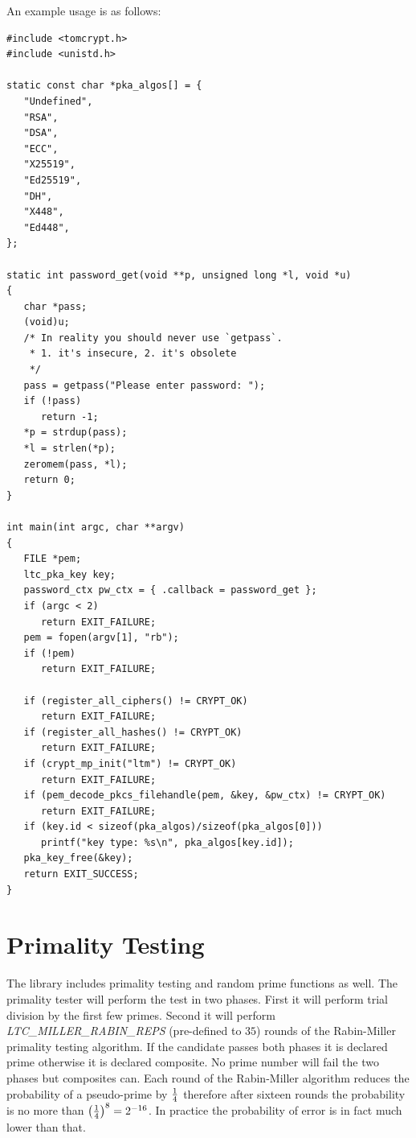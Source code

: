 \documentclass[synpaper]{book}
\newcommand{\mysection}[1]    %
	{                   %
	\section{#1}
   \markboth{\textsf{www.libtom.net}}{\thesection ~ {#1}}
	}
\begin{document}
An example usage is as follows:

\begin{small}
\begin{verbatim}
#include <tomcrypt.h>
#include <unistd.h>

static const char *pka_algos[] = {
   "Undefined",
   "RSA",
   "DSA",
   "ECC",
   "X25519",
   "Ed25519",
   "DH",
   "X448",
   "Ed448",
};

static int password_get(void **p, unsigned long *l, void *u)
{
   char *pass;
   (void)u;
   /* In reality you should never use `getpass`.
    * 1. it's insecure, 2. it's obsolete
    */
   pass = getpass("Please enter password: ");
   if (!pass)
      return -1;
   *p = strdup(pass);
   *l = strlen(*p);
   zeromem(pass, *l);
   return 0;
}

int main(int argc, char **argv)
{
   FILE *pem;
   ltc_pka_key key;
   password_ctx pw_ctx = { .callback = password_get };
   if (argc < 2)
      return EXIT_FAILURE;
   pem = fopen(argv[1], "rb");
   if (!pem)
      return EXIT_FAILURE;

   if (register_all_ciphers() != CRYPT_OK)
      return EXIT_FAILURE;
   if (register_all_hashes() != CRYPT_OK)
      return EXIT_FAILURE;
   if (crypt_mp_init("ltm") != CRYPT_OK)
      return EXIT_FAILURE;
   if (pem_decode_pkcs_filehandle(pem, &key, &pw_ctx) != CRYPT_OK)
      return EXIT_FAILURE;
   if (key.id < sizeof(pka_algos)/sizeof(pka_algos[0]))
      printf("key type: %s\n", pka_algos[key.id]);
   pka_key_free(&key);
   return EXIT_SUCCESS;
}

\end{verbatim}
\end{small}

\mysection{Primality Testing}
The library includes primality testing and random prime functions as well.  The primality tester will perform the test in
two phases.  First it will perform trial division by the first few primes.  Second it will perform \textit{LTC\_MILLER\_RABIN\_REPS} (pre-defined to $35$) rounds of the
Rabin-Miller primality testing algorithm.  If the candidate passes both phases it is declared prime otherwise it is declared
composite.  No prime number will fail the two phases but composites can.  Each round of the Rabin-Miller algorithm reduces
the probability of a pseudo-prime by $1 \over 4$ therefore after sixteen rounds the probability is no more than
$\left ( { 1 \over 4 } \right )^{8} = 2^{-16}$.  In practice the probability of error is in fact much lower than that.
\end{document}
